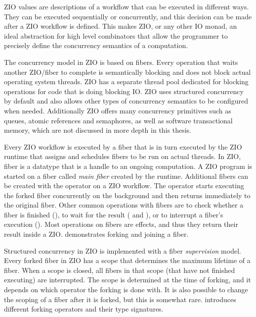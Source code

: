 ZIO values are descriptions of a workflow that can be executed in different ways. They can be executed sequentially or concurrently, and this decision can be made after a ZIO workflow is defined. This makes ZIO, or any other IO monad, an ideal abstraction for high level combinators that allow the programmer to precisely define the concurrency semantics of a computation.

The concurrency model in ZIO is based on fibers. Every operation that waits another ZIO/fiber to complete is semantically blocking and does not block actual operating system threads. ZIO has a separate thread pool dedicated for blocking operations for code that is doing blocking IO. ZIO uses structured concurrency by default and also allows other types of concurrency semantics to be configured when needed. Additionally ZIO offers many concurrency primitives such as queues, atomic references and semaphores, as well as software transactional memory, which are not discussed in more depth in this thesis.

Every ZIO workflow is executed by a fiber that is in turn executed by the ZIO runtime that assigns and schedules fibers to be run on actual threads. In ZIO, fiber is a datatype that is a handle to an ongoing computation. A ZIO program is started on a fiber called \emph{main fiber} created by the runtime. Additional fibers can be created with the  operator on a ZIO workflow. The  operator starts executing the forked fiber concurrently on the background and then returns immediately to the original fiber. Other common operations with fibers are to check whether a fiber is finished (), to wait for the result ( and ), or to interrupt a fiber's execution (). Most operations on fibers are effects, and thus they return their result inside a ZIO.  demonstrates forking and joining a fiber.



Structured concurrency in ZIO is implemented with a fiber \emph{supervision} model. Every forked fiber in ZIO has a scope that determines the maximum lifetime of a fiber. When a scope is closed, all fibers in that scope (that have not finished executing) are interrupted. The scope is determined at the time of forking, and it depends on which operator the forking is done with. It is also possible to change the scoping of a fiber after it is forked, but this is somewhat rare.  introduces different forking operators and their type signatures.

